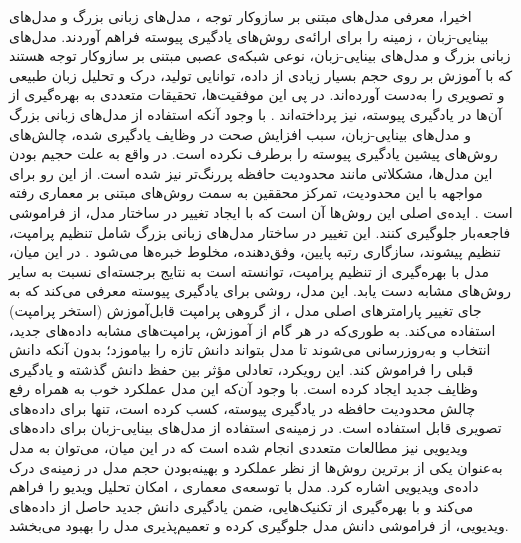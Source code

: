  
 
  اخیرا، معرفی مدل‌های مبتنی بر سازوکار توجه 
 \cite{bert-10,attention_is_all_u_need-46}،
 مدل‌های زبانی بزرگ    \cite{llm-example,gpt4} و مدل‌های بینایی-زبان \cite{clip,17}، زمینه را برای ارائه‌ی روش‌های یادگیری پیوسته فراهم آوردند\cite{llm_continual}. مدل‌های زبانی بزرگ و مدل‌های بینایی-زبان، نوعی شبکه‌ی عصبی مبتنی بر سازوکار توجه هستند که با آموزش بر روی حجم بسیار زیادی از داده‌، توانایی تولید، درک و تحلیل زبان طبیعی و تصویری را به‌دست آورده‌اند. در پی این موفقیت‌ها، تحقیقات متعددی به بهره‌گیری از آن‌ها در یادگیری پیوسته، نیز پرداخته‌اند \cite{llm_continual,l2p,clip-poolprompt,CoOp,ddas-2024,distillation}. با وجود آنکه استفاده از مدل‌های زبانی بزرگ و مدل‌های بینایی-زبان، سبب افزایش صحت در وظایف یادگیری شده، چالش‌های روش‌های پیشین یادگیری پیوسته را برطرف نکرده است. در واقع به علت حجیم بودن این مدل‌ها، مشکلاتی مانند محدودیت حافظه پررنگ‌تر نیز شده است. از این رو برای مواجهه با این محدودیت، تمرکز محققین به سمت روش‌های مبتنی بر معماری رفته است \cite{llm_continual}. ایده‌ی اصلی این روش‌ها آن است که با ایجاد تغییر در ساختار مدل، از فراموشی فاجعه‌بار جلوگیری کنند. این تغییر در ساختار مدل‌های زبانی بزرگ شامل تنظیم پرامپت، تنظیم پیشوند، سازگاری رتبه پایین، وفق‌دهنده، مخلوط خبره‌ها  می‌شود \cite{llm_continual}. در این میان، مدل
 \cite{l2p}
 با بهره‌گیری از تنظیم پرامپت، توانسته است به نتایج برجسته‌ای نسبت به سایر روش‌های مشابه دست ‌یابد. این مدل، روشی برای یادگیری پیوسته معرفی می‌کند که به جای تغییر پارامترهای اصلی مدل ، از گروهی پرامپت قابل‌آموزش (استخر پرامپت) استفاده می‌کند. به طوری‌که در هر گام از آموزش، پرامپت‌های مشابه داده‌های جدید، انتخاب و به‌روزرسانی می‌شوند تا مدل بتواند دانش تازه را بیاموزد؛ بدون آنکه دانش قبلی را فراموش کند. این رویکرد، تعادلی مؤثر بین حفظ دانش گذشته و یادگیری وظایف جدید ایجاد کرده است. 
 با وجود آن‌که این مدل عملکرد خوب به همراه رفع چالش محدودیت حافظه در یادگیری پیوسته، کسب کرده است، تنها برای داده‌های تصویری قابل استفاده است. در زمینه‌ی استفاده از مدل‌های بینایی-زبان برای داده‌های ویدیویی نیز مطالعات متعددی انجام شده است که در این میان، می‌توان به مدل \cite{open-vclip} به‌عنوان یکی از برترین روش‌ها از نظر عملکرد و بهینه‌بودن حجم مدل در زمینه‌ی درک داده‌ی ویدیویی اشاره کرد. مدل  با توسعه‌ی معماری ، امکان تحلیل ویدیو را فراهم می‌کند و با بهره‌گیری از تکنیک‌هایی، ضمن یادگیری دانش جدید حاصل از داده‌های ویدیویی، از فراموشی دانش مدل  جلوگیری کرده و تعمیم‌پذیری مدل را بهبود می‌بخشد. 
